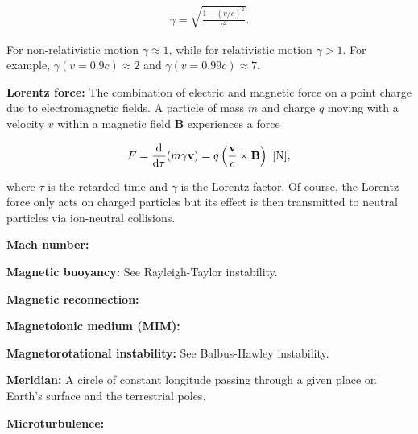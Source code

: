 \documentclass[a4paper,11pt]{article}
\begin{document}
\begin{align*}
    \gamma = \sqrt{\frac{1-(v/c)^2}{c^2}}.
\end{align*}

{\noindent}For non-relativistic motion $\gamma\approx1$, while for relativistic motion $\gamma>1$. For example, $\gamma(v=0.9c)\approx2$ and $\gamma(v=0.99c)\approx7$.

{\noindent}\textbf{Lorentz force:} The combination of electric and magnetic force on a point charge due to electromagnetic fields. A particle of mass $m$ and charge $q$ moving with a velocity $v$ within a magnetic field $\mathbf{B}$ experiences a force 

\begin{align*}
    F = \dfrac{\mathrm{d}}{\mathrm{d}\tau} (m\gamma\mathbf{v}) = q\left(\dfrac{\mathbf{v}}{c}\times\mathbf{B}\right) ~ [{\rm N}],
\end{align*}

{\noindent}where $\tau$ is the retarded time and $\gamma$ is the Lorentz factor. Of course, the Lorentz force only acts on charged particles but its effect is then transmitted to neutral particles via ion-neutral collisions.

{\noindent}\textbf{Mach number:}

{\noindent}\textbf{Magnetic buoyancy:} See Rayleigh-Taylor instability.

{\noindent}\textbf{Magnetic reconnection:}

{\noindent}\textbf{Magnetoionic medium (MIM):}

{\noindent}\textbf{Magnetorotational instability:} See Balbus-Hawley instability.

{\noindent}\textbf{Meridian:} A circle of constant longitude passing through a given place on Earth's surface and the terrestrial poles.

{\noindent}\textbf{Microturbulence:}
\end{document}
